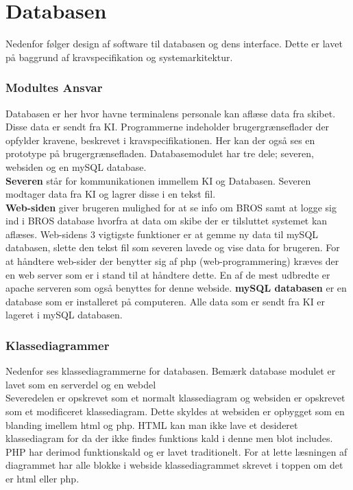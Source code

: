 \chapter{Databasen}
Nedenfor følger design af software til databasen og dens interface. Dette er lavet på baggrund af kravspecifikation og systemarkitektur. 


\subsection{Modultes Ansvar}
Databasen er her hvor havne terminalens personale kan aflæse data fra skibet. Disse data er sendt fra KI. Programmerne indeholder brugergrænseflader der opfylder kravene, beskrevet i kravspecifikationen. Her kan der også ses en prototype på brugergrænsefladen.
Databasemodulet har tre dele; severen, websiden og en mySQL database. \\
\textbf{Severen} står for kommunikationen immellem KI og Databasen. Severen modtager data fra KI og lagrer disse i en tekst fil.\\
\textbf{Web-siden} giver brugeren mulighed for at se info om BROS samt at logge sig ind i BROS database hvorfra at data om skibe der er tilsluttet systemet kan aflæses. Web-sidens 3 vigtigste funktioner er at gemme ny data til mySQL databasen, slette den tekst fil som severen lavede og vise data for brugeren. For at håndtere web-sider der benytter sig af php (web-programmering) kræves der en web server som er i stand til at håndtere dette. En af de mest udbredte er apache serveren som også benyttes for denne webside.
\textbf{mySQL databasen} er en database som er  installeret på computeren. Alle data som er sendt fra KI er lageret i mySQL databasen.

\subsection{Klassediagrammer}
Nedenfor ses klassediagrammerne for databasen. Bemærk database modulet er lavet som en serverdel og en webdel\\
Severedelen er opskrevet som et normalt klassediagram og websiden er opskrevet som et modificeret klassediagram. Dette skyldes at websiden er opbygget som en blanding imellem html og php. HTML kan man ikke lave et desideret klassediagram for da der ikke findes funktions kald i denne men blot includes. PHP har derimod funktionskald og er lavet traditionelt. For at lette læsningen af diagrammet har alle blokke i webside klassediagrammet skrevet i toppen om det er html eller php.

